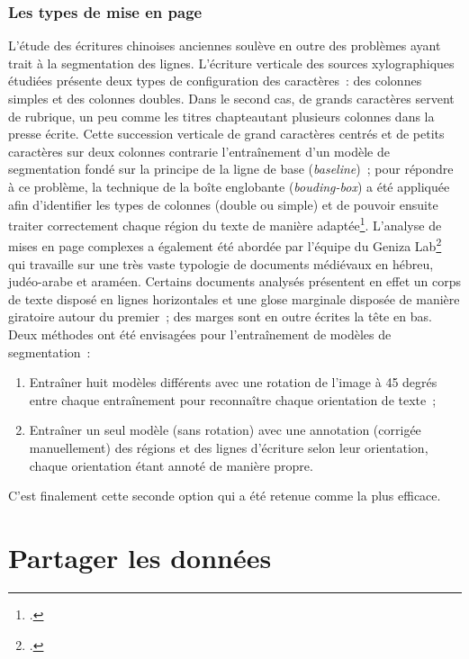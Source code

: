 \documentclass[a4paper,12pt,twoside]{book}
\begin{document}
		\subsubsection{Les types de mise en page}
		
		L'étude des écritures chinoises anciennes soulève en outre des problèmes
		ayant trait à la segmentation des lignes. L'écriture verticale des
		sources xylographiques étudiées présente deux types de configuration des
		caractères~: des colonnes simples et des colonnes doubles. Dans le
		second cas, de grands caractères servent de rubrique, un peu comme les
		titres chapteautant plusieurs colonnes dans la presse écrite. Cette
		succession verticale de grand caractères centrés et de petits caractères
		sur deux colonnes contrarie l'entraînement d'un modèle de segmentation
		fondé sur la principe de la ligne de base (\textit{baseline})~; pour
		répondre à ce problème, la technique de la boîte englobante
		(\textit{bouding-box}) a été appliquée afin d'identifier les types de
		colonnes (double ou simple) et de pouvoir ensuite traiter correctement
		chaque région du texte de manière adaptée\footcite{bizais-lilligExperimentationsPourAnalyse2022}. L'analyse de mises
		en page complexes a également été abordée par l'équipe du Geniza Lab\footcite{stoklbenezraSegmentationModeArchival2022} qui travaille sur une
		très vaste typologie de documents médiévaux en hébreu, judéo-arabe et
		araméen. Certains documents analysés présentent en effet un corps de
		texte disposé en lignes horizontales et une glose marginale disposée de
		manière giratoire autour du premier~; des marges sont en outre écrites
		la tête en bas. Deux méthodes ont été envisagées pour l'entraînement de
		modèles de segmentation~:
		
		\begin{enumerate}
			
			\item
			Entraîner huit modèles différents avec une rotation de l'image à 45
			degrés entre chaque entraînement pour reconnaître chaque orientation
			de texte~;
			\item
			Entraîner un seul modèle (sans rotation) avec une annotation (corrigée
			manuellement) des régions et des lignes d'écriture selon leur
			orientation, chaque orientation étant annoté de manière propre.
		\end{enumerate}
		
		C'est finalement cette seconde option qui a été retenue comme la plus
		efficace.
		
		\section{Partager les données}
		
\end{document}
